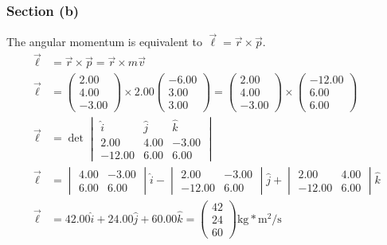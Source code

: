 \documentclass[12pt]{article}
\begin{document}
\subsubsection{Section (b)}
The angular momentum is equivalent to \(\vec{\ell} = \vec{r}\times\vec{p}\).
\begin{align}
    \vec{\ell}  &=  \vec{r} \times \vec{p}
        =   \vec{r} \times m\vec{v}\\
    \vec{\ell}  &=  \begin{pmatrix}2.00\\4.00\\-3.00\end{pmatrix} \times 2.00\begin{pmatrix}-6.00\\3.00\\3.00\end{pmatrix}
        =   \begin{pmatrix}2.00\\4.00\\-3.00\end{pmatrix} \times \begin{pmatrix}-12.00\\6.00\\6.00\end{pmatrix}\\
    \vec{\ell}  &=  \det\begin{vmatrix}
                            \hat{i} &\hat{j}&\hat{k}\\
                            2.00    &4.00   &-3.00  \\
                            -12.00  &6.00   &6.00
                        \end{vmatrix}\\
    \vec{\ell}  &=  \begin{vmatrix}4.00&-3.00\\6.00&6.00\end{vmatrix}\hat{i} -
                    \begin{vmatrix}2.00&-3.00\\-12.00&6.00\end{vmatrix}\hat{j} + 
                    \begin{vmatrix}2.00&4.00\\-12.00&6.00\end{vmatrix}\hat{k}\\
    \vec{\ell}  &=  42.00\hat{i} + 24.00\hat{j} + 60.00\hat{k} 
        = \boxed{\begin{pmatrix}42\\24\\60\end{pmatrix}\unit{\kilo\gram*\meter^2/\second}}
\end{align}
\end{document}
